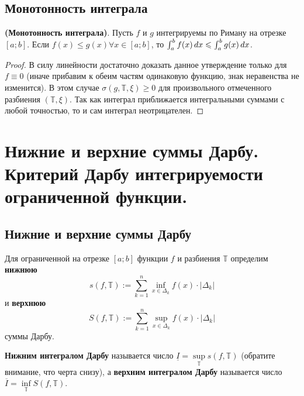 \documentclass[a4paper]{article}
\theoremstyle{named}
\newcommand{\T}{\mathbb{T}}
\renewcommand{\int}{\intop}
\begin{document}
        \subsection{Монотонность интеграла} 

        \begin{proposal*}
            \textbf{(Монотонность интеграла)}. Пусть $f$ и $g$ интегрируемы по Риману на отрезке $[a; b]$. Если $f(x) \leq g(x) \forall x \in [a; b]$, то $\int_a^b f(x) \dd x \leq \int_a^b g(x) \dd x$.
        \end{proposal*}

        \begin{proof}
            В силу линейности достаточно доказать данное утверждение только для $f \equiv 0$ (иначе прибавим к обеим частям одинаковую функцию, знак неравенства не изменится). В этом случае $\sigma(g, \T, \xi) \geq 0$ для произвольного отмеченного разбиения $(\T, \xi)$. Так как интеграл приближается интегральными суммами с любой точностью, то и сам интеграл неотрицателен.
        \end{proof}

    \section{Нижние и верхние суммы Дарбу. Критерий Дарбу интегрируемости ограниченной функции.}

        \subsection{Нижние и верхние суммы Дарбу}

        \begin{definition*}
            Для ограниченной на отрезке $[a; b]$ функции $f$ и разбиения $\T$ определим \textbf{нижнюю}
            \begin{equation*}
                s(f, \T) := \sum_{k = 1}^n \inf\limits_{x \in \Delta_k} f(x) \cdot |\Delta_k|
            \end{equation*}
            и \textbf{верхнюю}
            \begin{equation*}
                S(f, \T) := \sum_{k = 1}^n \sup\limits_{x \in \Delta_k} f(x) \cdot |\Delta_k|
            \end{equation*}
            суммы Дарбу.

            \textbf{Нижним интегралом Дарбу} называется число $\underline{I} = \sup\limits_{\T} s(f, \T)$ (обратите внимание, что черта снизу), а \textbf{верхним интегралом Дарбу} называется число $\overline{I} = \inf\limits_{\T} S(f, \T)$. 
        \end{definition*}
\end{document}
